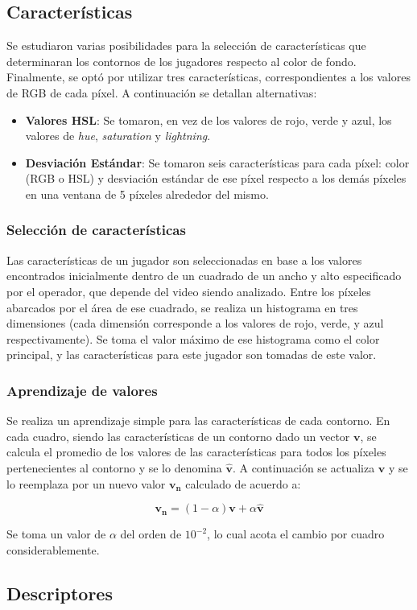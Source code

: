 \subsection{Características}
\label{sec:caracteristicas}

Se estudiaron varias posibilidades para la selección de características que
determinaran los contornos de los jugadores respecto al color de fondo.
Finalmente, se optó por utilizar tres características, correspondientes a los
valores de RGB de cada píxel. A continuación se detallan alternativas:
\begin{itemize}
  \item \textbf{Valores HSL}: Se tomaron, en vez de los valores de rojo, verde
    y azul, los valores de \textit{hue}, \textit{saturation} y
    \textit{lightning}.

  \item \textbf{Desviación Estándar}: Se tomaron seis características para cada
    píxel: color (RGB o HSL) y desviación estándar de ese píxel respecto a los
    demás píxeles en una ventana de 5 píxeles alrededor del mismo.

\end{itemize}

\subsubsection{Selección de características}

Las características de un jugador son seleccionadas en base a los valores
encontrados inicialmente dentro de un cuadrado de un ancho y alto especificado
por el operador, que depende del video siendo analizado. Entre los píxeles
abarcados por el área de ese cuadrado, se realiza un histograma en tres
dimensiones (cada dimensión corresponde a los valores de rojo, verde, y azul
respectivamente). Se toma el valor máximo de ese histograma como el color
principal, y las características para este jugador son tomadas de este valor.

\subsubsection{Aprendizaje de valores}

Se realiza un aprendizaje simple para las características de cada contorno. En
cada cuadro, siendo las características de un contorno dado un vector
$\mathbf{v}$, se calcula el promedio de los valores de las características para
todos los píxeles pertenecientes al contorno y se lo denomina
$\hat{\mathbf{v}}$. A continuación se actualiza $\mathbf{v}$ y se lo reemplaza
por un nuevo valor $\mathbf{v_n}$ calculado de acuerdo a:

\[
  \mathbf{v_n} = \left(1-\alpha\right)\mathbf{v} + \alpha \hat{\mathbf{v}}
\]

Se toma un valor de $\alpha$ del orden de $10^{-2}$, lo cual acota el cambio por
cuadro considerablemente. %

\subsection{Descriptores}
